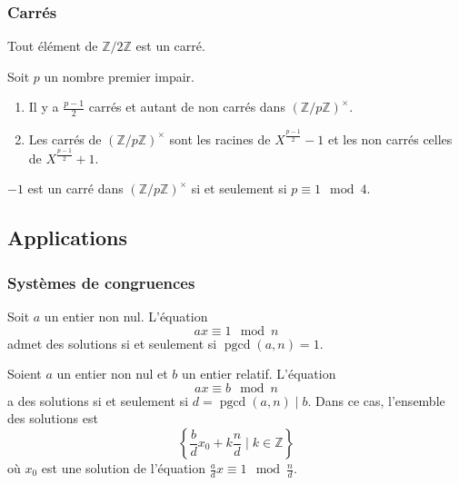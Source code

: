   \subsubsection{Carrés}


  \begin{remark}
    Tout élément de $\mathbb{Z}/2\mathbb{Z}$ est un carré.
  \end{remark}

  Soit $p$ un nombre premier impair.

  \begin{theorem}
    \begin{enumerate}[label={\bfseries(\roman*)}]
      \item Il y a $\frac{p-1}{2}$ carrés et autant de non carrés dans $(\mathbb{Z}/p\mathbb{Z})^\times$.
      \item Les carrés de $(\mathbb{Z}/p\mathbb{Z})^\times$ sont les racines de $X^{\frac{p-1}{2}} - 1$ et les non carrés celles de $X^{\frac{p-1}{2}} + 1$.
    \end{enumerate}
  \end{theorem}

  \begin{corollary}
    $-1$ est un carré dans $(\mathbb{Z}/p\mathbb{Z})^\times$ si et seulement si $p \equiv 1 \mod 4$.
  \end{corollary}

  \subsection{Applications}

  \subsubsection{Systèmes de congruences}


  \begin{proposition}
    Soit $a$ un entier non nul. L'équation
    \[ ax \equiv 1 \mod n \]
    admet des solutions si et seulement si $\operatorname{pgcd}(a,n) = 1$.
  \end{proposition}

  \begin{corollary}
    Soient $a$ un entier non nul et $b$ un entier relatif. L'équation
    \[ ax \equiv b \mod n \]
    a des solutions si et seulement si $d = \operatorname{pgcd}(a,n) \mid b$. Dans ce cas, l'ensemble des solutions est
    \[ \left\{ \frac{b}{d}x_0 + k\frac{n}{d} \mid k \in \mathbb{Z} \right\} \]
    où $x_0$ est une solution de l'équation $\frac{a}{d}x \equiv 1 \mod \frac{n}{d}$.
  \end{corollary}

